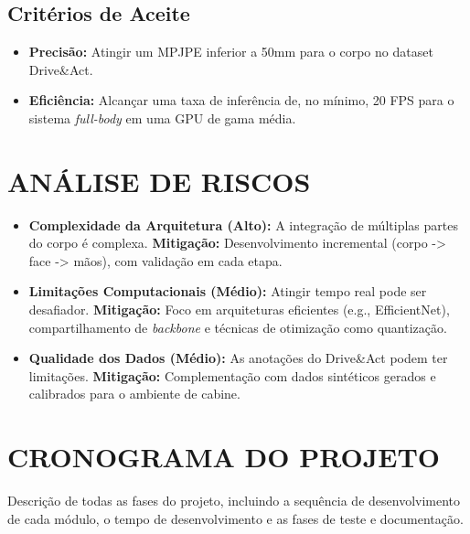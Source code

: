 \documentclass[12pt, a4paper]{article}
\begin{document}
\subsection{Critérios de Aceite}
\begin{itemize}
    \item \textbf{Precisão:} Atingir um MPJPE inferior a 50mm para o corpo no dataset Drive\&Act.
    \item \textbf{Eficiência:} Alcançar uma taxa de inferência de, no mínimo, 20 FPS para o sistema \textit{full-body} em uma GPU de gama média.
\end{itemize}

\section{ANÁLISE DE RISCOS}
\begin{itemize}
    \item \textbf{Complexidade da Arquitetura (Alto):} A integração de múltiplas partes do corpo é complexa. \textbf{Mitigação:} Desenvolvimento incremental (corpo -> face -> mãos), com validação em cada etapa.
    \item \textbf{Limitações Computacionais (Médio):} Atingir tempo real pode ser desafiador. \textbf{Mitigação:} Foco em arquiteturas eficientes (e.g., EfficientNet), compartilhamento de \textit{backbone} e técnicas de otimização como quantização.
    \item \textbf{Qualidade dos Dados (Médio):} As anotações do Drive\&Act podem ter limitações. \textbf{Mitigação:} Complementação com dados sintéticos gerados e calibrados para o ambiente de cabine.
\end{itemize}


\section{CRONOGRAMA DO PROJETO}

Descrição de todas as fases do projeto, incluindo a sequência de
desenvolvimento de cada módulo, o tempo de desenvolvimento e as fases de teste
e documentação.
\end{document}
